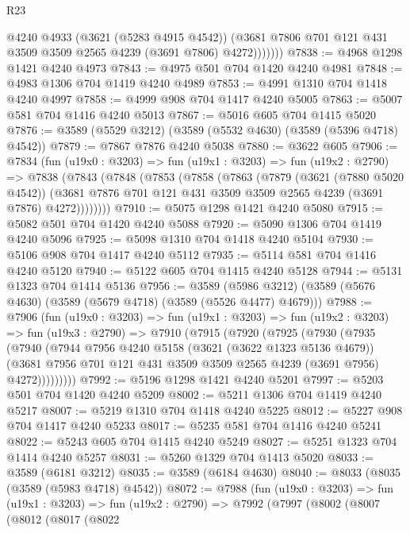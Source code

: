 \begin{lexlean}{R23}
\begin{coremodule}
                @4240
                @4933
                (@3621 (@5283 @4915 @4542))
                (@3681 @7806 @701 @121 @431 @3509 @3509 @2565 @4239 (@3691 @7806) @4272)))))))
@7838 := @4968 @1298 @1421 @4240 @4973
@7843 := @4975 @501 @704 @1420 @4240 @4981
@7848 := @4983 @1306 @704 @1419 @4240 @4989
@7853 := @4991 @1310 @704 @1418 @4240 @4997
@7858 := @4999 @908 @704 @1417 @4240 @5005
@7863 := @5007 @581 @704 @1416 @4240 @5013
@7867 := @5016 @605 @704 @1415 @5020
@7876 := @3589 (@5529 @3212) (@3589 (@5532 @4630) (@3589 (@5396 @4718) @4542))
@7879 := @7867 @7876 @4240 @5038
@7880 := @3622 @605
@7906 := @7834
    (fun (u19x0 : @3203) =>
    fun (u19x1 : @3203) =>
    fun (u19x2 : @2790) =>
    @7838
      (@7843
        (@7848
          (@7853
            (@7858
              (@7863
                (@7879
                  (@3621 (@7880 @5020 @4542))
                  (@3681 @7876 @701 @121 @431 @3509 @3509 @2565 @4239 (@3691 @7876) @4272))))))))
@7910 := @5075 @1298 @1421 @4240 @5080
@7915 := @5082 @501 @704 @1420 @4240 @5088
@7920 := @5090 @1306 @704 @1419 @4240 @5096
@7925 := @5098 @1310 @704 @1418 @4240 @5104
@7930 := @5106 @908 @704 @1417 @4240 @5112
@7935 := @5114 @581 @704 @1416 @4240 @5120
@7940 := @5122 @605 @704 @1415 @4240 @5128
@7944 := @5131 @1323 @704 @1414 @5136
@7956 := @3589 (@5986 @3212) (@3589 (@5676 @4630) (@3589 (@5679 @4718) (@3589 (@5526 @4477) @4679)))
@7988 := @7906
    (fun (u19x0 : @3203) =>
    fun (u19x1 : @3203) =>
    fun (u19x2 : @3203) =>
    fun (u19x3 : @2790) =>
    @7910
      (@7915
        (@7920
          (@7925
            (@7930
              (@7935
                (@7940
                  (@7944
                    @7956
                    @4240
                    @5158
                    (@3621 (@3622 @1323 @5136 @4679))
                    (@3681 @7956 @701 @121 @431 @3509 @3509 @2565 @4239 (@3691 @7956) @4272)))))))))
@7992 := @5196 @1298 @1421 @4240 @5201
@7997 := @5203 @501 @704 @1420 @4240 @5209
@8002 := @5211 @1306 @704 @1419 @4240 @5217
@8007 := @5219 @1310 @704 @1418 @4240 @5225
@8012 := @5227 @908 @704 @1417 @4240 @5233
@8017 := @5235 @581 @704 @1416 @4240 @5241
@8022 := @5243 @605 @704 @1415 @4240 @5249
@8027 := @5251 @1323 @704 @1414 @4240 @5257
@8031 := @5260 @1329 @704 @1413 @5020
@8033 := @3589 (@6181 @3212)
@8035 := @3589 (@6184 @4630)
@8040 := @8033 (@8035 (@3589 (@5983 @4718) @4542))
@8072 := @7988
    (fun (u19x0 : @3203) =>
    fun (u19x1 : @3203) =>
    fun (u19x2 : @2790) =>
    @7992
      (@7997
        (@8002
          (@8007
            (@8012
              (@8017
                (@8022

\end{coremodule}
\end{lexlean}

